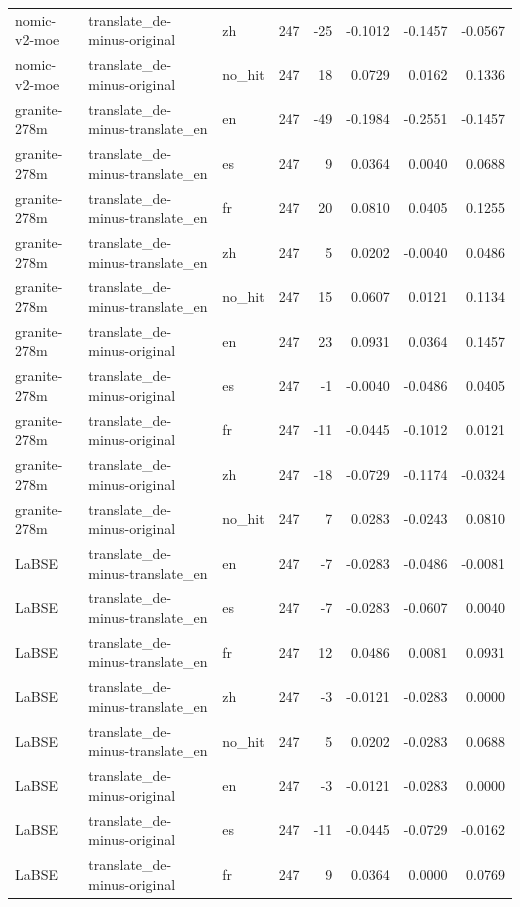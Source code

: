\begin{tabular}{lllrrrrr}
nomic-v2-moe & translate\_de-minus-original & zh & 247 & -25 & -0.1012 & -0.1457 & -0.0567 \\
nomic-v2-moe & translate\_de-minus-original & no\_hit & 247 & 18 & 0.0729 & 0.0162 & 0.1336 \\
granite-278m & translate\_de-minus-translate\_en & en & 247 & -49 & -0.1984 & -0.2551 & -0.1457 \\
granite-278m & translate\_de-minus-translate\_en & es & 247 & 9 & 0.0364 & 0.0040 & 0.0688 \\
granite-278m & translate\_de-minus-translate\_en & fr & 247 & 20 & 0.0810 & 0.0405 & 0.1255 \\
granite-278m & translate\_de-minus-translate\_en & zh & 247 & 5 & 0.0202 & -0.0040 & 0.0486 \\
granite-278m & translate\_de-minus-translate\_en & no\_hit & 247 & 15 & 0.0607 & 0.0121 & 0.1134 \\
granite-278m & translate\_de-minus-original & en & 247 & 23 & 0.0931 & 0.0364 & 0.1457 \\
granite-278m & translate\_de-minus-original & es & 247 & -1 & -0.0040 & -0.0486 & 0.0405 \\
granite-278m & translate\_de-minus-original & fr & 247 & -11 & -0.0445 & -0.1012 & 0.0121 \\
granite-278m & translate\_de-minus-original & zh & 247 & -18 & -0.0729 & -0.1174 & -0.0324 \\
granite-278m & translate\_de-minus-original & no\_hit & 247 & 7 & 0.0283 & -0.0243 & 0.0810 \\
LaBSE & translate\_de-minus-translate\_en & en & 247 & -7 & -0.0283 & -0.0486 & -0.0081 \\
LaBSE & translate\_de-minus-translate\_en & es & 247 & -7 & -0.0283 & -0.0607 & 0.0040 \\
LaBSE & translate\_de-minus-translate\_en & fr & 247 & 12 & 0.0486 & 0.0081 & 0.0931 \\
LaBSE & translate\_de-minus-translate\_en & zh & 247 & -3 & -0.0121 & -0.0283 & 0.0000 \\
LaBSE & translate\_de-minus-translate\_en & no\_hit & 247 & 5 & 0.0202 & -0.0283 & 0.0688 \\
LaBSE & translate\_de-minus-original & en & 247 & -3 & -0.0121 & -0.0283 & 0.0000 \\
LaBSE & translate\_de-minus-original & es & 247 & -11 & -0.0445 & -0.0729 & -0.0162 \\
LaBSE & translate\_de-minus-original & fr & 247 & 9 & 0.0364 & 0.0000 & 0.0769 \\

\end{tabular}
